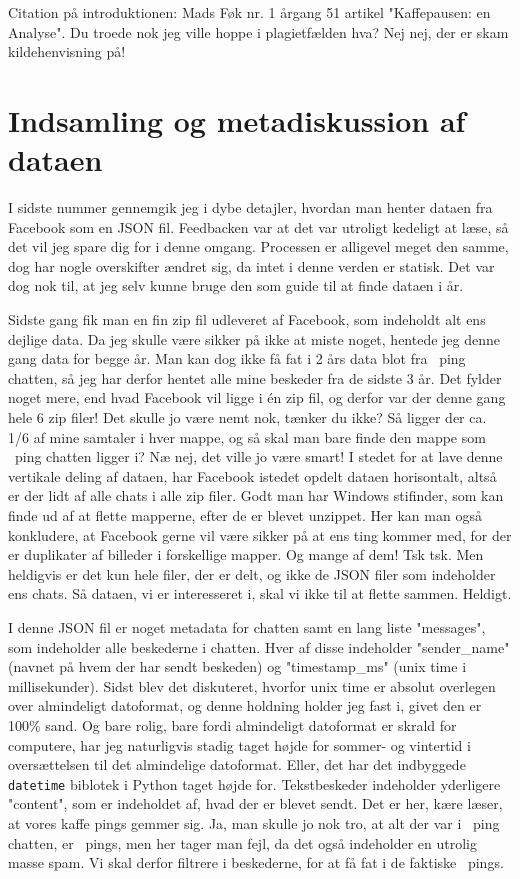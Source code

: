 \documentclass{article}
\newlength\myheight
\newlength\mydepth
\newcommand*\inlinegraphics[1]{%
  \settototalheight\myheight{Xygp}%
  \settodepth\mydepth{Xygp}%
  \raisebox{-\mydepth}{\texttt{[image: \#1]}}%
}
\newcommand{\coffee}[0]{\inlinegraphics{coffee.png}}
\begin{document}
Citation på introduktionen: Mads Føk nr. 1 årgang 51 artikel "Kaffepausen: en Analyse".
Du troede nok jeg ville hoppe i plagietfælden hva? Nej nej, der er skam kildehenvisning på!


\section*{Indsamling og metadiskussion af dataen}

I sidste nummer gennemgik jeg i dybe detajler, hvordan man henter dataen fra Facebook som en JSON fil. Feedbacken var at det var utroligt kedeligt at læse, så det vil jeg spare dig for i denne omgang. Processen er alligevel meget den samme, dog har nogle overskifter ændret sig, da intet i denne verden er statisk. Det var dog nok til, at jeg selv kunne bruge den som guide til at finde dataen i år.

Sidste gang fik man en fin zip fil udleveret af Facebook, som indeholdt alt ens dejlige data.
Da jeg skulle være sikker på ikke at miste noget, hentede jeg denne gang data for begge år. Man kan dog ikke få fat i 2 års data blot fra \coffee\ ping chatten, så jeg har derfor hentet alle mine beskeder fra de sidste 3 år.
Det fylder noget mere, end hvad Facebook vil ligge i én zip fil, og derfor var der denne gang hele 6 zip filer!
Det skulle jo være nemt nok, tænker du ikke? Så ligger der ca. 1/6 af mine samtaler i hver mappe, og så skal man bare finde den mappe som \coffee\ ping chatten ligger i?
Næ nej, det ville jo være smart! I stedet for at lave denne vertikale deling af dataen, har Facebook istedet opdelt dataen horisontalt, altså er der lidt af alle chats i alle zip filer. Godt man har Windows stifinder, som kan finde ud af at flette mapperne, efter de er blevet unzippet.
Her kan man også konkludere, at Facebook gerne vil være sikker på at ens ting kommer med, for der er duplikater af billeder i forskellige mapper. Og mange af dem! Tsk tsk.
Men heldigvis er det kun hele filer, der er delt, og ikke de JSON filer som indeholder ens chats. Så dataen, vi er interesseret i, skal vi ikke til at flette sammen. Heldigt.

I denne JSON fil er noget metadata for chatten samt en lang liste "messages", som indeholder alle beskederne i chatten. Hver af disse indeholder "sender\_name" (navnet på hvem der har sendt beskeden) og "timestamp\_ms" (unix time i millisekunder). Sidst blev det diskuteret, hvorfor unix time er absolut overlegen over almindeligt datoformat, og denne holdning holder jeg fast i, givet den er 100\% sand.
Og bare rolig, bare fordi almindeligt datoformat er skrald for computere, har jeg naturligvis stadig taget højde for sommer- og vintertid i oversættelsen til det almindelige datoformat. Eller, det har det indbyggede \texttt{datetime} biblotek i Python taget højde for.
Tekstbeskeder indeholder yderligere "content", som er indeholdet af, hvad der er blevet sendt. Det er her, kære læser, at vores kaffe pings gemmer sig. Ja, man skulle jo nok tro, at alt der var i \coffee\ ping chatten, er \coffee\ pings, men her tager man fejl, da det også indeholder en utrolig masse spam. Vi skal derfor filtrere i beskederne, for at få fat i de faktiske \coffee\ pings.
\end{document}
